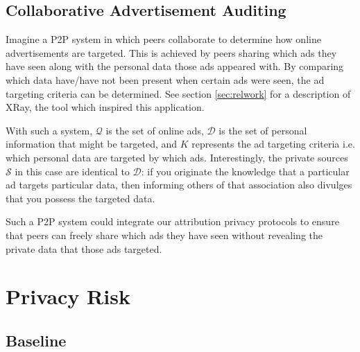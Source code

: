 \documentclass{article}
\newcommand{\secref}[1]{section \ref{sec:#1}}
\begin{document}
\subsection{Collaborative Advertisement Auditing}\label{sec:xray}

Imagine a P2P system in which peers collaborate to determine how online
advertisements are targeted. This is achieved by peers sharing which ads they
have seen along with the personal data those ads appeared with. By comparing
which data have/have not been present when certain ads were seen, the ad
targeting criteria can be determined. See \secref{relwork} for a description of
XRay, the tool which inspired this application.

With such a system, $\mathcal{Q}$ is the set of online ads, $\mathcal{D}$ is the
set of personal information that might be targeted, and $K$ represents the ad
targeting criteria i.e. which personal data are targeted by which ads.
Interestingly, the private sources $\mathcal{S}$ in this case are identical to
$\mathcal{D}$: if you originate the knowledge that a particular ad targets
particular data, then informing others of that association also divulges that
you possess the targeted data.

Such a P2P system could integrate our attribution privacy protocols to ensure
that peers can freely share which ads they have seen without revealing the
private data that those ads targeted.

\section{Privacy Risk}\label{sec:prrsk}
\subsection{Baseline}\label{sec:baseline}
\end{document}
